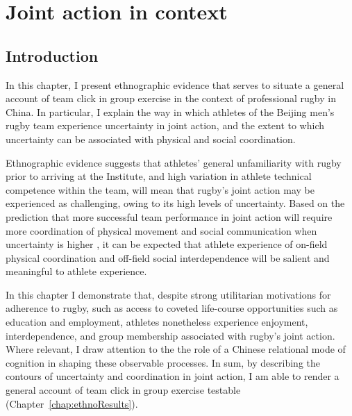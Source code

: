 \chapter{\label{chap:ethnoField} Joint action in context}

\minitoc




\begin{CJK}{UTF8}{gbsn}








\section{Introduction}

In this chapter, I present ethnographic evidence that serves to situate a general account of team click in group exercise in the context of professional rugby in China.  In particular, I explain the way in which athletes of the Beijing men's rugby team experience uncertainty in joint action, and the extent to which uncertainty can be associated with physical and social coordination.

Ethnographic evidence suggests that athletes' general unfamiliarity with rugby prior to arriving at the Institute, and high variation in athlete technical competence within the team, will mean that rugby's joint action may be experienced as challenging, owing to its high levels of uncertainty.  Based on the prediction that more successful team performance in joint action will require more coordination of physical movement and social communication when uncertainty is higher \citep{Riley2011}, it can be expected that athlete experience of on-field physical coordination and off-field social interdependence will be salient and meaningful to athlete experience.

In this chapter I demonstrate that, despite strong utilitarian motivations for adherence to rugby, such as access to coveted life-course opportunities such as education and employment, athletes nonetheless experience enjoyment, interdependence, and group membership associated with rugby's joint action.  Where relevant, I draw attention to the the role of a Chinese relational mode of cognition in shaping these observable processes.  In sum, by describing the contours of uncertainty and coordination in joint action, I am able to render a general account of team click in group exercise testable (Chapter~\ref{chap:ethnoResults}).






\end{CJK}
